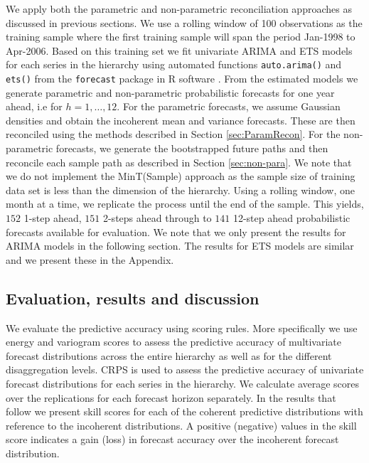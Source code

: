 \documentclass[12pt]{article}
\theoremstyle{definition}
\begin{document}
We apply both the parametric and non-parametric reconciliation approaches as discussed in previous sections. We use a rolling window of 100 observations as the training sample where the first training sample will span the period Jan-1998 to Apr-2006. Based on this training set we fit univariate ARIMA and ETS models for each series in the hierarchy using automated functions \verb|auto.arima()| and \verb|ets()| from the \verb|forecast| package \citep{Rforecast} in R software \citep{Rcore}.
From the estimated models we generate parametric and non-parametric probabilistic forecasts for one year ahead, i.e for $h=1,\dots,12$. For the parametric forecasts, we assume Gaussian densities and obtain the incoherent mean and variance forecasts. These are then reconciled using the methods described in Section \ref{sec:ParamRecon}. For the non-parametric forecasts, we generate the bootstrapped future paths and then reconcile each sample path as described in Section \ref{sec:non-para}. We note that we do not implement the MinT(Sample) approach as the sample size of training data set is less than the dimension of the hierarchy. Using a rolling window, one month at a time, we replicate the process until the end of the sample. This yields, $152$ 1-step ahead, $151$ 2-steps ahead through to $141$ 12-step ahead probabilistic forecasts available for evaluation. We note that we only present the results for ARIMA models in the following section. The results for ETS models are similar and we present these in the Appendix.


\subsection{Evaluation, results and discussion}

We evaluate the predictive accuracy using scoring rules. More specifically we use energy and variogram scores to assess the predictive accuracy of multivariate forecast distributions across the entire hierarchy as well as for the different disaggregation levels. CRPS is used to assess the predictive accuracy of univariate forecast distributions for each series in the hierarchy. We calculate average scores over the replications for each forecast horizon separately. In the results that follow we present skill scores for each of the coherent predictive distributions with reference to the incoherent distributions. A positive (negative) values in the skill score indicates a gain (loss) in forecast accuracy over the incoherent forecast distribution.
\end{document}
